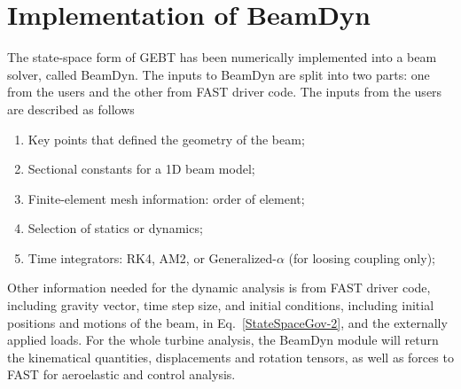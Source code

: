 \documentclass{aiaa-tc}
\begin{document}
\section{Implementation of BeamDyn}
The state-space form of GEBT has been numerically implemented into a beam solver, called BeamDyn. The inputs to BeamDyn are split into two parts: one from the users and the other from FAST driver code. The inputs from the users are described as follows
\begin{enumerate}
    \item Key points that defined the geometry of the beam; 
    \item Sectional constants for a 1D beam model;
    \item Finite-element mesh information: order of element;
    \item Selection of statics or dynamics;
    \item Time integrators: RK4, AM2, or Generalized-$\alpha$ (for loosing coupling only);
\end{enumerate}
Other information needed for the dynamic analysis is from FAST driver code, including gravity vector, time step size, and initial conditions, including initial positions and motions of the beam, in Eq.~\eqref{StateSpaceGov-2}, and the externally applied loads.  For the whole turbine analysis, the BeamDyn module will return the kinematical quantities, displacements and rotation tensors, as well as forces to FAST for aeroelastic and control analysis.
\end{document}
